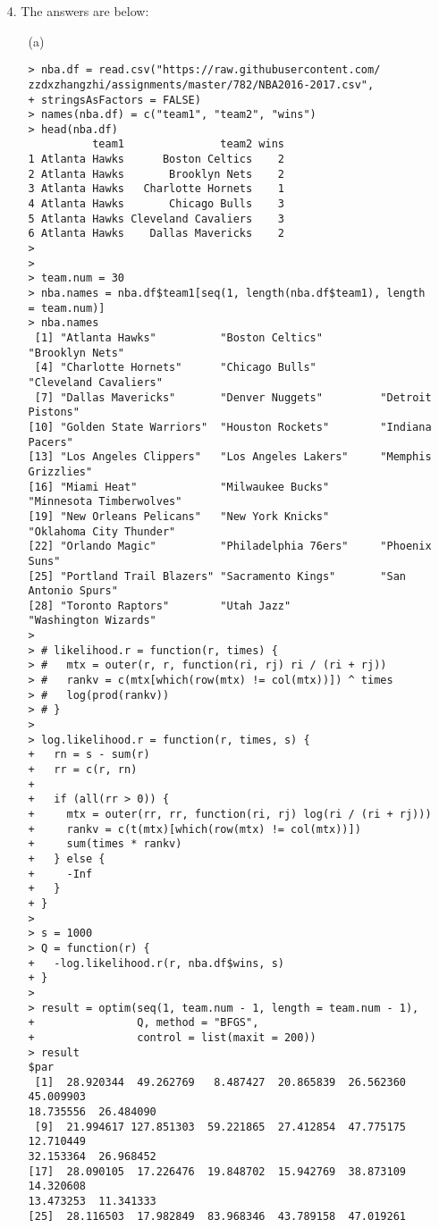 \documentclass[11pt]{report}
\theoremstyle{definition}
\theoremstyle{remark}
\begin{document}
\begin{enumerate}
    \item[4.] The answers are below:
    \begin{enumerate}
    	\item[(a)] \begin{verbatim}> nba.df = read.csv("https://raw.githubusercontent.com/
zzdxzhangzhi/assignments/master/782/NBA2016-2017.csv",
+ stringsAsFactors = FALSE)
> names(nba.df) = c("team1", "team2", "wins")
> head(nba.df)
          team1               team2 wins
1 Atlanta Hawks      Boston Celtics    2
2 Atlanta Hawks       Brooklyn Nets    2
3 Atlanta Hawks   Charlotte Hornets    1
4 Atlanta Hawks       Chicago Bulls    3
5 Atlanta Hawks Cleveland Cavaliers    3
6 Atlanta Hawks    Dallas Mavericks    2
> 
> 
> team.num = 30
> nba.names = nba.df$team1[seq(1, length(nba.df$team1), length = team.num)]
> nba.names
 [1] "Atlanta Hawks"          "Boston Celtics"         "Brooklyn Nets"         
 [4] "Charlotte Hornets"      "Chicago Bulls"          "Cleveland Cavaliers"   
 [7] "Dallas Mavericks"       "Denver Nuggets"         "Detroit Pistons"       
[10] "Golden State Warriors"  "Houston Rockets"        "Indiana Pacers"        
[13] "Los Angeles Clippers"   "Los Angeles Lakers"     "Memphis Grizzlies"     
[16] "Miami Heat"             "Milwaukee Bucks"        "Minnesota Timberwolves"
[19] "New Orleans Pelicans"   "New York Knicks"        "Oklahoma City Thunder" 
[22] "Orlando Magic"          "Philadelphia 76ers"     "Phoenix Suns"          
[25] "Portland Trail Blazers" "Sacramento Kings"       "San Antonio Spurs"     
[28] "Toronto Raptors"        "Utah Jazz"              "Washington Wizards"    
> 
> # likelihood.r = function(r, times) {
> #   mtx = outer(r, r, function(ri, rj) ri / (ri + rj))
> #   rankv = c(mtx[which(row(mtx) != col(mtx))]) ^ times
> #   log(prod(rankv))
> # }
> 
> log.likelihood.r = function(r, times, s) {
+   rn = s - sum(r)
+   rr = c(r, rn)
+   
+   if (all(rr > 0)) {
+     mtx = outer(rr, rr, function(ri, rj) log(ri / (ri + rj)))
+     rankv = c(t(mtx)[which(row(mtx) != col(mtx))])
+     sum(times * rankv)
+   } else {
+     -Inf
+   }
+ }
> 
> s = 1000
> Q = function(r) {
+   -log.likelihood.r(r, nba.df$wins, s)
+ }
> 
> result = optim(seq(1, team.num - 1, length = team.num - 1), 
+                Q, method = "BFGS", 
+                control = list(maxit = 200))
> result
$par
 [1]  28.920344  49.262769   8.487427  20.865839  26.562360  45.009903  
18.735556  26.484090
 [9]  21.994617 127.851303  59.221865  27.412854  47.775175  12.710449  
32.153364  26.968452
[17]  28.090105  17.226476  19.848702  15.942769  38.873109  14.320608  
13.473253  11.341333
[25]  28.116503  17.982849  83.968346  43.789158  47.019261


\end{verbatim}
\end{enumerate}
\end{enumerate}
\end{document}
